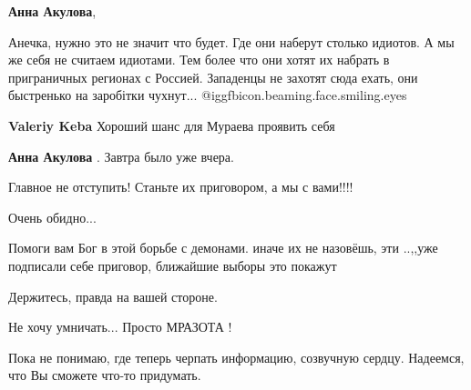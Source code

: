 \begin{itemize}
\begin{itemize}
\textbf{Анна Акулова}, 

Анечка, нужно это не значит что будет. Где они наберут столько идиотов. А мы же
себя не считаем идиотами. Тем более что они хотят их набрать в приграничных
регионах с Россией. Западенцы не захотят сюда ехать, они быстренько на
заробітки чухнут...  @igg{fbicon.beaming.face.smiling.eyes} 

\textbf{Valeriy Keba} Хороший шанс для Мураева проявить себя

\textbf{Анна Акулова} .
Завтра было уже вчера.

\end{itemize} %

Главное не отступить! Станьте их приговором, а мы с вами!!!!

Очень обидно...

Помоги вам Бог в этой борьбе с демонами. иначе их не назовёшь, эти ..,,уже
подписали себе приговор, ближайшие выборы это покажут

Держитесь, правда на вашей стороне.

Не хочу умничать...
Просто МРАЗОТА !

Пока не понимаю, где теперь черпать информацию, созвучную сердцу. Надеемся, что
Вы сможете что-то придумать.

\end{itemize} %
